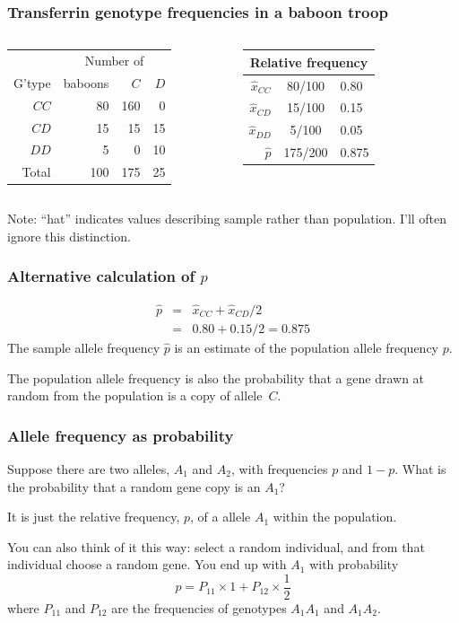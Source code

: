 \documentclass[handout]{beamer}
\begin{document}
\begin{frame}
\frametitle{Transferrin genotype frequencies in a baboon troop}
\begin{columns}
\begin{tabular}{rrrr}
        &\multicolumn{3}{c}{Number of}\\ \cline{2-4}
G'type& baboons &$C$&$D$\\ \hline
$CC$    &  80 & 160&  0\\
$CD$    &  15 &  15& 15\\
$DD$    &   5 &   0& 10\\ \hline
Total   & 100 & 175& 25\\
\end{tabular}
\begin{tabular}{r@{$\;=\;$}c@{$\;=\;$}l}
\multicolumn{3}{c}{Relative frequency}\\ \hline
$\hat x_{CC}$&80/100&0.80\\
$\hat x_{CD}$&15/100&0.15\\
$\hat x_{DD}$& 5/100&0.05\\
$\hat p$ & 175/200 & 0.875
\end{tabular}
\end{columns}

\bigskip
\pause
Note: ``hat'' indicates values describing sample rather than
population.
\pause
I'll often ignore this distinction.
\end{frame}

\begin{frame}
\frametitle{Alternative calculation of $p$}
\begin{eqnarray*}
\hat p &=& \hat x_{CC} + \hat x_{CD}/2\\
&=& 0.80 + 0.15/2 = 0.875
\end{eqnarray*}
The sample allele frequency $\hat p$ is an estimate of the population allele
frequency $p$.

\bigskip

The population allele frequency is also the probability that a gene drawn at
random from the population is a copy of allele~$C$.
\end{frame}

\begin{frame}
\frametitle{Allele frequency as probability}
Suppose there are two alleles, $A_1$ and $A_2$, with frequencies $p$
and $1-p$. What is the probability that a random gene copy is an
$A_1$? 

\bigskip
\pause

It is just the relative frequency, $p$, of a allele $A_1$ within the population.

\bigskip
\pause

You can also think of it this way: select a random individual, and
from that individual choose a random gene. You end up with $A_1$ with
probability 
\[
p = P_{11}\times 1 + P_{12}\times\frac{1}{2}
\]
where $P_{11}$ and $P_{12}$ are the frequencies of genotypes $A_1A_1$
and $A_1A_2$.
\end{frame}
\end{document}
